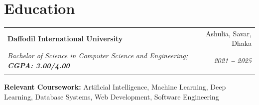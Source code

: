 \documentclass[letterpaper,11pt]{article}
\makeatletter
\newcommand{\resumeEducationHeading}[6]{
  \vspace{-4pt}\item %
    \begin{tabular*}{0.97\textwidth}[t]{l@{\extracolsep{\fill}}r}
      \textbf{#1} & #2 \\
      \textit{\small#3} & \textit{\small #4} \\
      \textit{\small#5} & \textit{\small #6} \\
    \end{tabular*}\vspace{-8pt} %
}
\newcommand{\resumeSubHeadingListStart}{\begin{itemize}[leftmargin=0.15in, label={}]}
\newcommand{\resumeSubHeadingListEnd}{\end{itemize}}
\makeatother
\begin{document}

\section{Education}
  \vspace{-4pt} %
  \resumeSubHeadingListStart
    
    \resumeEducationHeading
      {Daffodil International University}{Ashulia, Savar, Dhaka}
      {Bachelor of Science in Computer Science and Engineering;   \textbf{CGPA: 3.00/4.00}}{2021 \textbf{--} 2025}
      {}{}
        \resumeSubHeadingListStart
        \small{\item{
            \textbf{Relevant Coursework:} Artificial Intelligence, Machine Learning, Deep Learning, Database Systems, Web Development, Software Engineering
        }}
        \resumeSubHeadingListEnd
    
  \resumeSubHeadingListEnd



\end{document}
